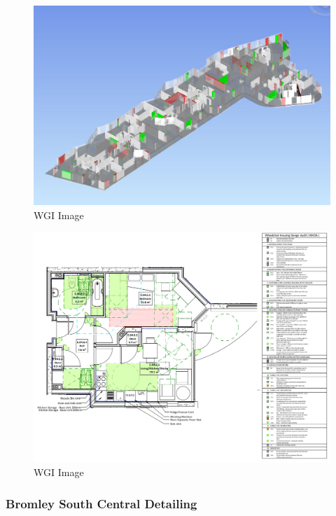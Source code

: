 \documentclass[
]{article}
\begin{document}
\begin{figure}[H]

{\centering \includegraphics{assets/WGI/WGI-AuditNavis.JPG}

}

\caption{WGI Image}

\end{figure}%
\begin{figure}[H]

{\centering \includegraphics{assets/WGI/WGI-4.png}

}

\caption{WGI Image}

\end{figure}%

\subsubsection{Bromley South Central
Detailing}\label{bromley-south-central-detailing}
\end{document}
